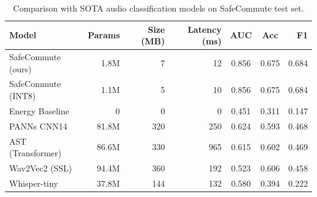 \begin{table}[h]
\centering
\caption{Comparison with SOTA audio classification models on SafeCommute test set.}
\label{tab:efficiency}
\begin{tabular}{lrrrccr}
\toprule
Model & Params & Size (MB) & Latency (ms) & AUC & Acc & F1 \\
\midrule
SafeCommute (ours) & 1.8M & 7 & 12 & 0.856 & 0.675 & 0.684 \\
SafeCommute (INT8) & 1.1M & 5 & 10 & 0.856 & 0.675 & 0.684 \\
Energy Baseline & 0 & 0 & 0 & 0.451 & 0.311 & 0.147 \\
PANNs CNN14 & 81.8M & 320 & 250 & 0.624 & 0.593 & 0.468 \\
AST (Transformer) & 86.6M & 330 & 965 & 0.615 & 0.602 & 0.469 \\
Wav2Vec2 (SSL) & 94.4M & 360 & 192 & 0.523 & 0.606 & 0.458 \\
Whisper-tiny & 37.8M & 144 & 132 & 0.580 & 0.394 & 0.222 \\
\bottomrule
\end{tabular}
\end{table}
